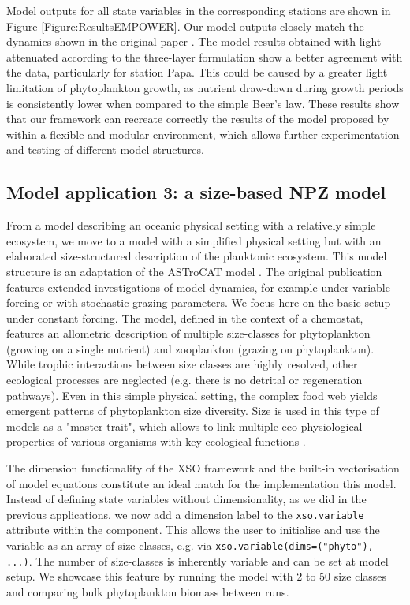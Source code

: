 \documentclass[journal abbreviation, manuscript]{copernicus}
\begin{document}
Model outputs for all state variables in the corresponding stations are shown in Figure \ref{Figure:ResultsEMPOWER}. Our model outputs closely match the dynamics shown in the original paper \citep{Anderson2015c}. The model results obtained with light attenuated according to the three-layer formulation show a better agreement with the data, particularly for station Papa. This could be caused by a greater light limitation of phytoplankton growth, as nutrient draw-down during growth periods is consistently lower when compared to the simple Beer's law. These results show that our framework can recreate correctly the results of the model proposed by \citet{Anderson2015c} within a flexible and modular environment, which allows further experimentation and testing of different model structures.


\subsection{Model application 3: a size-based NPZ model}

From a model describing an oceanic physical setting with a relatively simple ecosystem, we move to a model with a simplified physical setting but with an elaborated size-structured description of the planktonic ecosystem. This model structure is an adaptation of the ASTroCAT model \citep{Banas2011b}. The original publication features extended investigations of model dynamics, for example under variable forcing or with stochastic grazing parameters. We focus here on the basic setup under constant forcing. The model, defined in the context of a chemostat, features an allometric description of multiple size-classes for phytoplankton (growing on a single nutrient) and zooplankton (grazing on phytoplankton). While trophic interactions between size classes are highly resolved, other ecological processes are neglected (e.g. there is no detrital or regeneration pathways). Even in this simple physical setting, the complex food web yields emergent patterns of phytoplankton size diversity. Size is used in this type of models as a "master trait", which allows to link multiple eco-physiological properties of various organisms with key ecological functions \citep{Litchman2008}. 

The dimension functionality of the XSO framework and the built-in vectorisation of model equations constitute an ideal match for the implementation this model. Instead of defining state variables without dimensionality, as we did in the previous applications, we now add a dimension label to the \texttt{xso.variable} attribute within the component. This allows the user to initialise and use the variable as an array of size-classes, e.g. via \texttt{xso.variable(dims=("phyto"), ...)}. The number of size-classes is inherently variable and can be set at model setup. We showcase this feature by running the model with 2 to 50 size classes and comparing bulk phytoplankton biomass between runs.
\end{document}
